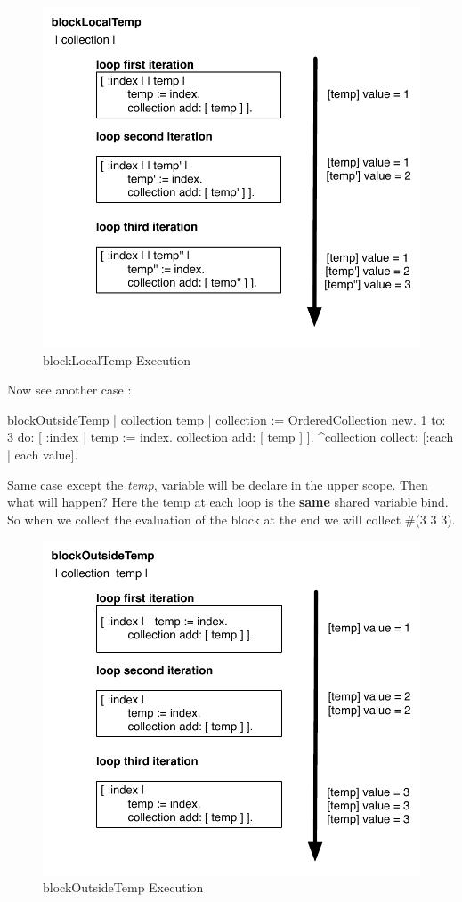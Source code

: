 \documentclass[a4paper,10pt,twoside]{book}
\begin{document}
\begin{figure}[htbp]
	\centering
        \includegraphics[width=0.7\linewidth]{blockClosureLocalTemp}
	\caption{blockLocalTemp Execution}
	\label{fig:blockLocalTempExecution}
\end{figure}

Now see another case :
\begin{code}{}
blockOutsideTemp
		| collection temp |
		collection := OrderedCollection new.
		1 to: 3 do: [ :index |
			temp := index.
			collection add: [ temp ] ].
		^collection collect: [:each | each value].
\end{code}
Same case except the \emph{temp}, variable will be  declare in the upper scope. Then what will happen? Here the temp at each loop is the \textbf{same} shared variable bind. So when we collect the evaluation of the block at the end we will collect \#(3 3 3).
\begin{figure}[htbp]
	\centering
		\includegraphics[width=0.7\linewidth]{blockClosureOutsideTemp}
	\caption{blockOutsideTemp Execution}
	\label{fig:blockClosureOutsideTemp}
\end{figure}
\end{document}
